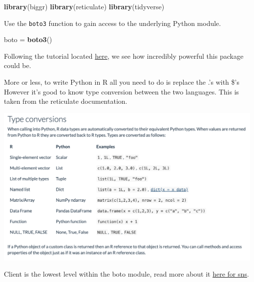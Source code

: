 \documentclass[]{book}
\newenvironment{Shaded}{\begin{snugshade}}{\end{snugshade}}
\newcommand{\DataTypeTok}[1]{\textcolor[rgb]{0.13,0.29,0.53}{#1}}
\newcommand{\KeywordTok}[1]{\textcolor[rgb]{0.13,0.29,0.53}{\textbf{#1}}}
\newcommand{\NormalTok}[1]{#1}
\newcommand{\OperatorTok}[1]{\textcolor[rgb]{0.81,0.36,0.00}{\textbf{#1}}}
\newcommand{\StringTok}[1]{\textcolor[rgb]{0.31,0.60,0.02}{#1}}
\begin{document}
\begin{Shaded}
\begin{Highlighting}[]
\KeywordTok{library}\NormalTok{(biggr)}
\KeywordTok{library}\NormalTok{(reticulate)}
\KeywordTok{library}\NormalTok{(tidyverse)}
\end{Highlighting}
\end{Shaded}

Use the \texttt{boto3} function to gain access to the underlying Python module.

\begin{Shaded}
\begin{Highlighting}[]
\NormalTok{boto =}\StringTok{ }\KeywordTok{boto3}\NormalTok{()}
\end{Highlighting}
\end{Shaded}

Following the tutorial located \href{https://bradmontgomery.net/blog/sending-sms-messages-amazon-sns-and-python/}{here}, we see how incredibly powerful this package could be.

More or less, to write Python in R all you need to do is replace the .'s with \$'s However it's good to know type conversion between the two languages. This is taken from the reticulate documentation.

\includegraphics{_bookdown_files/reticulateconversions.png}

Client is the lowest level within the boto module, read more about it \href{https://boto3.amazonaws.com/v1/documentation/api/latest/reference/services/sns.html\#client}{here for sns}.

\begin{Shaded}
\end{Shaded}
\end{document}
